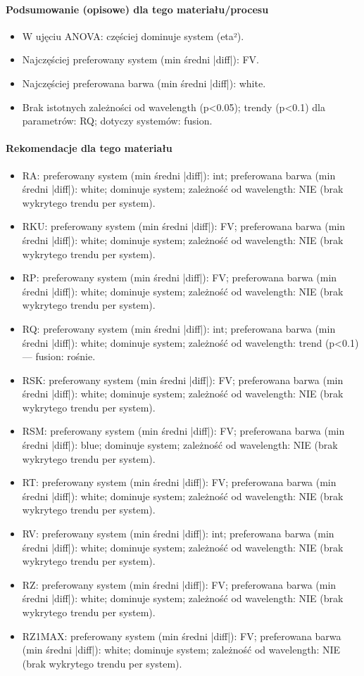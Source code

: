 \documentclass[
  10pt,
]{article}
\begin{document}
\paragraph{Podsumowanie (opisowe) dla tego materiału/procesu}
\begin{itemize}
\item W ujęciu ANOVA: częściej dominuje system (eta²).
\item Najczęściej preferowany system (min średni |diff|): FV.
\item Najczęściej preferowana barwa (min średni |diff|): white.
\item Brak istotnych zależności od wavelength (p<0.05); trendy (p<0.1) dla parametrów: RQ; dotyczy systemów: fusion.
\end{itemize}
\paragraph{Rekomendacje dla tego materiału}
\begin{itemize}
\item RA: preferowany system (min średni |diff|): int; preferowana barwa (min średni |diff|): white; dominuje system; zależność od wavelength: NIE (brak wykrytego trendu per system).
\item RKU: preferowany system (min średni |diff|): FV; preferowana barwa (min średni |diff|): white; dominuje system; zależność od wavelength: NIE (brak wykrytego trendu per system).
\item RP: preferowany system (min średni |diff|): FV; preferowana barwa (min średni |diff|): white; dominuje system; zależność od wavelength: NIE (brak wykrytego trendu per system).
\item RQ: preferowany system (min średni |diff|): int; preferowana barwa (min średni |diff|): white; dominuje system; zależność od wavelength: trend (p<0.1) — fusion: rośnie.
\item RSK: preferowany system (min średni |diff|): FV; preferowana barwa (min średni |diff|): white; dominuje system; zależność od wavelength: NIE (brak wykrytego trendu per system).
\item RSM: preferowany system (min średni |diff|): FV; preferowana barwa (min średni |diff|): blue; dominuje system; zależność od wavelength: NIE (brak wykrytego trendu per system).
\item RT: preferowany system (min średni |diff|): FV; preferowana barwa (min średni |diff|): white; dominuje system; zależność od wavelength: NIE (brak wykrytego trendu per system).
\item RV: preferowany system (min średni |diff|): int; preferowana barwa (min średni |diff|): white; dominuje system; zależność od wavelength: NIE (brak wykrytego trendu per system).
\item RZ: preferowany system (min średni |diff|): FV; preferowana barwa (min średni |diff|): white; dominuje system; zależność od wavelength: NIE (brak wykrytego trendu per system).
\item RZ1MAX: preferowany system (min średni |diff|): FV; preferowana barwa (min średni |diff|): white; dominuje system; zależność od wavelength: NIE (brak wykrytego trendu per system).
\end{itemize}
\end{document}
